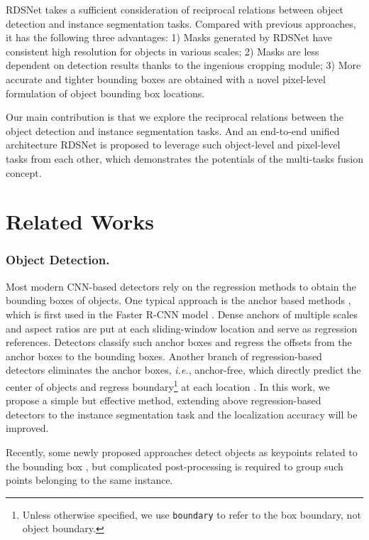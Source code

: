 \documentclass[letterpaper]{article} \usepackage{aaai20}  \usepackage{times}  \usepackage{helvet} \usepackage{courier}  \usepackage[hyphens]{url}  \usepackage{graphicx} \urlstyle{rm} \def\UrlFont{\rm}  \usepackage{graphicx}  \frenchspacing  \setlength{\pdfpagewidth}{8.5in}  \setlength{\pdfpageheight}{11in}
\newcommand{\ie}{\textit{i.e.}}
\begin{document}
RDSNet takes a sufficient consideration of reciprocal relations between object detection and instance segmentation tasks.
Compared with previous approaches, it has the following three advantages: 1) Masks generated by RDSNet have consistent high resolution for objects in various scales; 2) Masks are less dependent on detection results thanks to the ingenious cropping module; 3) More accurate and tighter bounding boxes are obtained with a novel pixel-level formulation of object bounding box locations. 

Our main contribution is that we explore the reciprocal relations between the object detection and instance segmentation tasks. And an end-to-end unified architecture RDSNet is proposed to leverage such object-level and pixel-level tasks from each other, which demonstrates the potentials of the multi-tasks fusion concept. 

\section{Related Works}
\subsubsection{Object Detection.}
Most modern CNN-based detectors rely on the regression methods to obtain the bounding boxes of objects. One typical approach is the anchor based methods , which is first used in the Faster R-CNN model \cite{ren2015faster}. Dense anchors of multiple scales and aspect ratios are put at each sliding-window location and serve as regression references. Detectors classify such anchor boxes and regress the offsets from the anchor boxes to the bounding boxes. Another branch of regression-based detectors eliminates the anchor boxes, \ie, anchor-free, which directly predict the center of objects and regress boundary\footnote{Unless otherwise specified, we use \texttt{boundary} to refer to the box boundary, not object boundary. } at each location \cite{DBLP:journals/corr/HuangYDY15,Yang2019RepPoints,Tian2019FCOS}. In this work, we propose a simple but effective method, extending above regression-based detectors to the instance segmentation task and the localization accuracy will be improved.

Recently, some newly proposed approaches detect objects as keypoints related to the bounding box \cite{law2018cornernet,zhou2019bottom,duan2019centernet}, but complicated post-processing is required to group such points belonging to the same instance. 
\end{document}

